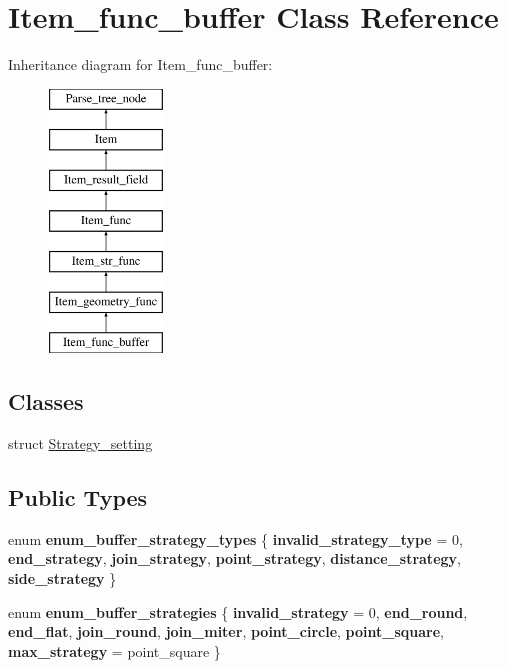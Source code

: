 \hypertarget{classItem__func__buffer}{}\section{Item\+\_\+func\+\_\+buffer Class Reference}
\label{classItem__func__buffer}
Inheritance diagram for Item\+\_\+func\+\_\+buffer\+:\begin{figure}[H]
\begin{center}
\leavevmode
\includegraphics[height=7.000000cm]{classItem__func__buffer}
\end{center}
\end{figure}
\subsection*{Classes}
\begin{DoxyCompactItemize}
\item 
struct \mbox{\hyperlink{structItem__func__buffer_1_1Strategy__setting}{Strategy\+\_\+setting}}
\end{DoxyCompactItemize}
\subsection*{Public Types}
\begin{DoxyCompactItemize}
\item 
\mbox{\label{classItem__func__buffer_acfd5ec497bd36eb0e4e6f9f75700d798}} 
enum {\bfseries enum\+\_\+buffer\+\_\+strategy\+\_\+types} \{ \newline
{\bfseries invalid\+\_\+strategy\+\_\+type} = 0, 
{\bfseries end\+\_\+strategy}, 
{\bfseries join\+\_\+strategy}, 
{\bfseries point\+\_\+strategy}, 
\newline
{\bfseries distance\+\_\+strategy}, 
{\bfseries side\+\_\+strategy}
 \}
\item 
\mbox{\label{classItem__func__buffer_a5845386a29fc49ef69812ecab902e0be}} 
enum {\bfseries enum\+\_\+buffer\+\_\+strategies} \{ \newline
{\bfseries invalid\+\_\+strategy} = 0, 
{\bfseries end\+\_\+round}, 
{\bfseries end\+\_\+flat}, 
{\bfseries join\+\_\+round}, 
\newline
{\bfseries join\+\_\+miter}, 
{\bfseries point\+\_\+circle}, 
{\bfseries point\+\_\+square}, 
{\bfseries max\+\_\+strategy} = point\+\_\+square
 \}
\end{DoxyCompactItemize}
